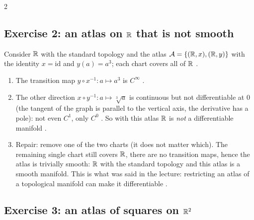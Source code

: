 \begin{paracol}{2}
\subsection*{Exercise 2: an atlas on $\mathbb{R}$ that is not smooth}

Consider $\mathbb{R}$ with the standard topology and the atlas $\mathcal A=\{(\mathbb{R},x),(\mathbb{R},y)\}$ with the identity $x=\mathrm{id}$ and $y(a)=a^3$; each chart covers all of $\mathbb{R}$ .
\begin{enumerate}
  \item The transition map $y\circ x^{-1}\colon a\mapsto a^3$ is $C^\infty$ .
  \item The other direction $x\circ y^{-1}\colon a\mapsto\sqrt[3]a$ is continuous but not differentiable at $0$ (the tangent of the graph is parallel to the vertical axis, the derivative has a pole): not even $C^1$, only $C^0$ .
        So with this atlas $\mathbb{R}$ is \emph{not} a differentiable manifold .
  \item Repair: remove one of the two charts (it does not matter which). The remaining single chart still covers $\mathbb{R}$, there are no transition maps, hence the atlas is trivially smooth: $\mathbb{R}$ with the standard topology and this atlas is a smooth manifold. This is what was said in the lecture:
        restricting an atlas of a topological manifold can make it differentiable .
\end{enumerate}

\subsection*{Exercise 3: an atlas of squares on $\mathbb{R}^2$}


\end{paracol}
